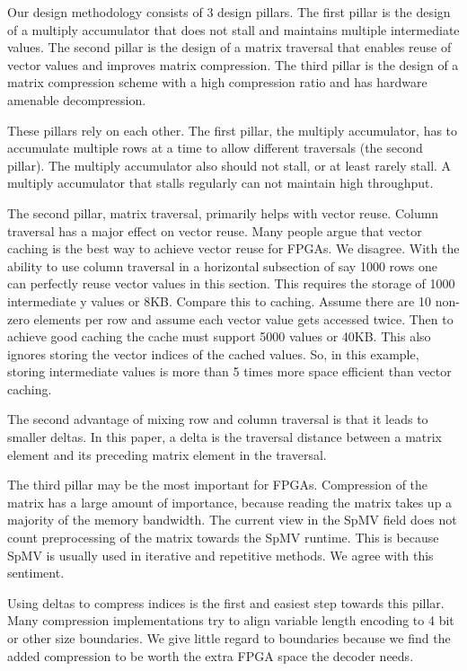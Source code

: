 \par Our design methodology consists of 3 design pillars. The first pillar is the design of a multiply accumulator that does not stall and maintains multiple intermediate values. The second pillar is the design of a matrix traversal that enables reuse of vector values and improves matrix compression. The third pillar is the design of a matrix compression scheme with a high compression ratio and has hardware amenable decompression.
\par These pillars rely on each other. The first pillar, the multiply accumulator, has to accumulate multiple rows at a time to allow different traversals (the second pillar). The multiply accumulator also should not stall, or at least rarely stall. A multiply accumulator that stalls regularly can not maintain high throughput.
\par The second pillar, matrix traversal, primarily helps with vector reuse. Column traversal has a major effect on vector reuse. Many people argue that vector caching is the best way to achieve vector reuse for FPGAs. We disagree. With the ability to use column traversal in a horizontal subsection of say 1000 rows one can perfectly reuse vector values in this section. This requires the storage of 1000 intermediate y values or 8KB. Compare this to caching. Assume there are 10 non-zero elements per row and assume each vector value gets accessed twice. Then to achieve good caching the cache must support 5000 values or 40KB. This also ignores storing the vector indices of the cached values. So, in this example, storing intermediate values is more than 5 times more space efficient than vector caching.
\par The second advantage of mixing row and column traversal is that it leads to smaller deltas. In this paper, a delta is the traversal distance between a matrix element and its preceding matrix element in the traversal.
\par The third pillar may be the most important for FPGAs. Compression of the matrix has a large amount of importance, because reading the matrix takes up a majority of the memory bandwidth. The current view in the SpMV field does not count preprocessing of the matrix towards the SpMV runtime. This is because SpMV is usually used in iterative and repetitive methods. We agree with this sentiment.
\par Using deltas to compress indices is the first and easiest step towards this pillar. Many compression implementations try to align variable length encoding to 4 bit or other size boundaries. We give little regard to boundaries because we find the added compression to be worth the extra FPGA space the decoder needs.
